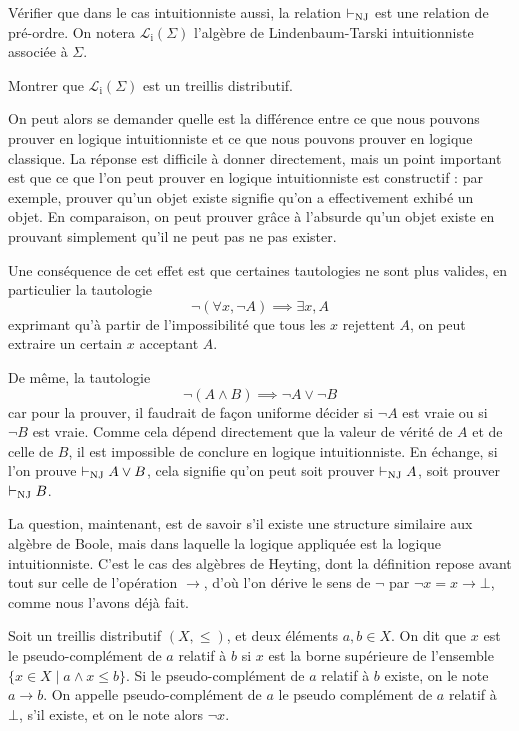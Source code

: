 \begin{exercise}
  Vérifier que dans le cas intuitionniste aussi, la relation $\vdash_{\operatorname{NJ}}$ est une
  relation de pré-ordre. On notera $\mathcal L_\mathrm i(\Sigma)$ l'algèbre de
  Lindenbaum-Tarski intuitionniste associée à $\Sigma$.
\end{exercise}

\begin{exercise}
  Montrer que $\mathcal L_\mathrm i(\Sigma)$ est un treillis distributif.
\end{exercise}

On peut alors se demander quelle est la différence entre ce que nous pouvons
prouver en logique intuitionniste et ce que nous pouvons prouver en logique
classique. La réponse est difficile à donner directement, mais un point
important est que ce que l'on peut prouver en logique intuitionniste est
constructif : par exemple, prouver qu'un objet existe signifie qu'on a
effectivement exhibé un objet. En comparaison, on peut prouver grâce à l'absurde
qu'un objet existe en prouvant simplement qu'il ne peut pas ne pas exister.

Une conséquence de cet effet est que certaines tautologies ne sont plus valides,
en particulier la tautologie
\[\lnot(\forall x, \lnot A) \implies \exists x, A\]
exprimant qu'à partir de l'impossibilité que tous les $x$ rejettent $A$, on peut
extraire un certain $x$ acceptant $A$.

De même, la tautologie
\[\lnot (A \land B) \implies \lnot A \lor \lnot B\]
car pour la prouver, il faudrait de façon uniforme décider si $\lnot A$ est
vraie ou si $\lnot B$ est vraie. Comme cela dépend directement que la valeur de
vérité de $A$ et de celle de $B$, il est impossible de conclure en logique
intuitionniste. En échange, si l'on prouve $\vdash_{\operatorname{NJ}} A \lor B$, cela signifie qu'on
peut soit prouver $\vdash_{\operatorname{NJ}} A$, soit prouver $\vdash_{\operatorname{NJ}} B$.

La question, maintenant, est de savoir s'il existe une structure similaire aux
algèbre de Boole, mais dans laquelle la logique appliquée est la logique
intuitionniste. C'est le cas des algèbres de Heyting, dont la définition repose
avant tout sur celle de l'opération $\to$, d'où l'on dérive le sens de $\lnot$
par $\lnot x = x \to \bot$, comme nous l'avons déjà fait.

\begin{definition}
  Soit un treillis distributif $(X,\leq)$, et deux éléments $a,b\in X$. On dit
  que $x$ est le pseudo-complément de $a$ relatif à $b$ si $x$ est la borne
  supérieure de l'ensemble $\{x \in X \mid a \land x \leq b\}$. Si le
  pseudo-complément de $a$ relatif à $b$ existe, on le note $a\to b$. On appelle
  pseudo-complément de $a$ le pseudo complément de $a$ relatif à $\bot$, s'il
  existe, et on le note alors $\lnot x$.
\end{definition}

